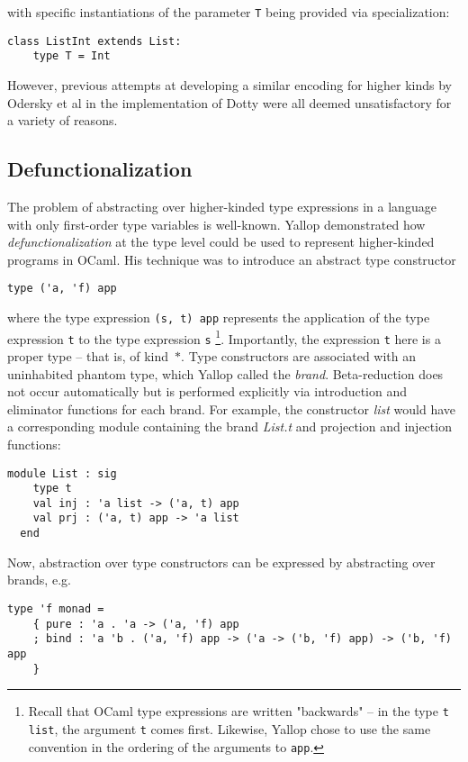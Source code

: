 \documentclass[acmsmall,screen]{acmart}
\begin{document}
with specific instantiations of the parameter \texttt{T} being provided via
specialization:
\begin{lstlisting}[style=scala]
  class ListInt extends List:
    type T = Int
\end{lstlisting}

However, previous attempts at developing a similar encoding for higher kinds by
Odersky et al in the implementation of Dotty \cite{OderskyDotty} were all
deemed unsatisfactory for a variety of reasons.

\subsection{Defunctionalization}

The problem of abstracting over higher-kinded type expressions in a language
with only first-order type variables is well-known. Yallop
\cite{Yallop_White_2014} demonstrated how \emph{defunctionalization} at the
type level could be used to represent higher-kinded programs in OCaml. His
technique was to introduce an abstract type constructor
\begin{lstlisting}[style=ocaml]
  type ('a, 'f) app
\end{lstlisting}

where the type expression \texttt{(s, t) app} represents the application of
the type expression \texttt{t} to the type expression \texttt{s}
\footnote{Recall that OCaml type expressions are written "backwards" -- in the
type \texttt{t list}, the argument \texttt{t} comes first. Likewise, Yallop
chose to use the same convention in the ordering of the arguments to
\texttt{app}.}. Importantly, the expression \texttt{t} here is a proper type --
that is, of kind~$*$. Type constructors are associated with an uninhabited
phantom type, which Yallop called the \emph{brand}. Beta-reduction does not
occur automatically but is performed explicitly via introduction and eliminator
functions for each brand. For example, the constructor \emph{list} would have a
corresponding module containing the brand \emph{List.t} and projection and
injection functions:
\begin{lstlisting}[style=ocaml]
  module List : sig
    type t
    val inj : 'a list -> ('a, t) app
    val prj : ('a, t) app -> 'a list
  end
\end{lstlisting}

Now, abstraction over type constructors can be expressed by abstracting over
brands, e.g.
\begin{lstlisting}[style=ocaml]
  type 'f monad =
    { pure : 'a . 'a -> ('a, 'f) app
    ; bind : 'a 'b . ('a, 'f) app -> ('a -> ('b, 'f) app) -> ('b, 'f) app
    }
\end{lstlisting}
\end{document}
